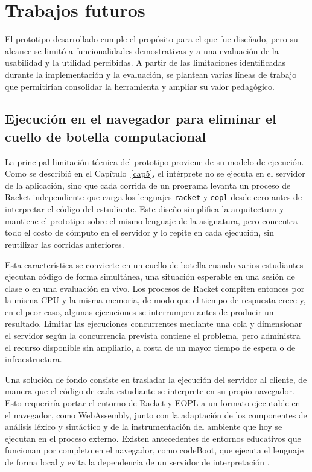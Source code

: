 \section{Trabajos futuros}

El prototipo desarrollado cumple el propósito para el que fue diseñado, pero su alcance se limitó a funcionalidades demostrativas y a una evaluación de la usabilidad y la utilidad percibidas. A partir de las limitaciones identificadas durante la implementación y la evaluación, se plantean varias líneas de trabajo que permitirían consolidar la herramienta y ampliar su valor pedagógico.

\subsection{Ejecución en el navegador para eliminar el cuello de botella computacional}

La principal limitación técnica del prototipo proviene de su modelo de ejecución. Como se describió en el Capítulo~\ref{cap5}, el intérprete no se ejecuta en el servidor de la aplicación, sino que cada corrida de un programa levanta un proceso de Racket independiente que carga los lenguajes \texttt{racket} y \texttt{eopl} desde cero antes de interpretar el código del estudiante. Este diseño simplifica la arquitectura y mantiene el prototipo sobre el mismo lenguaje de la asignatura, pero concentra todo el costo de cómputo en el servidor y lo repite en cada ejecución, sin reutilizar las corridas anteriores.

Esta característica se convierte en un cuello de botella cuando varios estudiantes ejecutan código de forma simultánea, una situación esperable en una sesión de clase o en una evaluación en vivo. Los procesos de Racket compiten entonces por la misma CPU y la misma memoria, de modo que el tiempo de respuesta crece y, en el peor caso, algunas ejecuciones se interrumpen antes de producir un resultado. Limitar las ejecuciones concurrentes mediante una cola y dimensionar el servidor según la concurrencia prevista contiene el problema, pero administra el recurso disponible sin ampliarlo, a costa de un mayor tiempo de espera o de infraestructura.

Una solución de fondo consiste en trasladar la ejecución del servidor al cliente, de manera que el código de cada estudiante se interprete en su propio navegador. Esto requeriría portar el entorno de Racket y EOPL a un formato ejecutable en el navegador, como WebAssembly, junto con la adaptación de los componentes de análisis léxico y sintáctico y de la instrumentación del ambiente que hoy se ejecutan en el proceso externo. Existen antecedentes de entornos educativos que funcionan por completo en el navegador, como codeBoot, que ejecuta el lenguaje de forma local y evita la dependencia de un servidor de interpretación \cite{feeley2022codeboot}.

